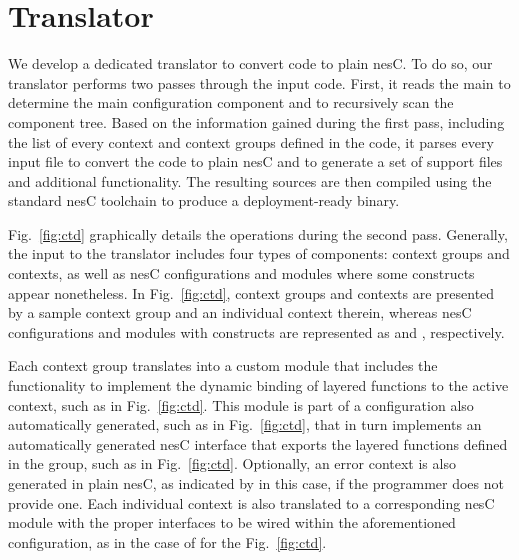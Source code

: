 \section{Translator}\label{sec:translator}

We develop a dedicated translator to convert \conesc code to plain
nesC. To do so, our translator performs two passes through the input
code. First, it reads the main  to determine the main
configuration component and to recursively scan the component
tree. Based on the information gained during the first pass, including
the list of every context and context groups defined in the code, it
parses every input file to convert the \conesc code to plain nesC and
to generate a set of support files and additional functionality. The
resulting sources are then compiled using the standard nesC toolchain
to produce a deployment-ready binary.


Fig.~\ref{fig:ctd} graphically details the operations during the
second pass. Generally, the input to the translator includes four types
of components: \conesc context groups and contexts, as well as nesC
configurations and modules where some \conesc constructs appear
nonetheless.  In Fig.~\ref{fig:ctd}, context groups and contexts are
presented by a sample  context group and an individual
 context therein, whereas nesC configurations and modules with
\conesc constructs are represented as  and ,
respectively.

Each context group translates into a custom module that includes the
functionality to implement the dynamic binding of layered functions to
the active context, such as  in
Fig.~\ref{fig:ctd}. This module is part of a configuration also
automatically generated, such as  in
Fig.~\ref{fig:ctd}, that in turn implements an automatically generated
nesC interface that exports the layered functions defined in the
group, such as  in Fig.~\ref{fig:ctd}. Optionally, an
error context is also generated in plain nesC, as indicated by
 in this case, if the programmer does not
provide one. Each individual context is also translated to a
corresponding nesC module with the proper interfaces to be wired
within the aforementioned configuration, as in the case of
 for the 
Fig.~\ref{fig:ctd}.


